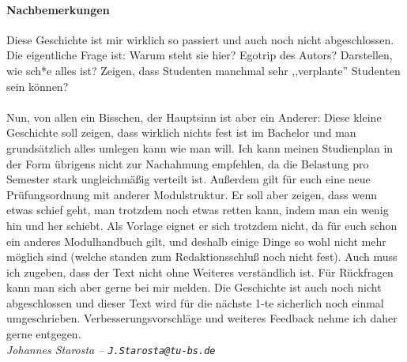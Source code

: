 \paragraph{Nachbemerkungen}
Diese Geschichte ist mir wirklich so passiert und auch noch nicht
abgeschlossen. %
 Die eigentliche Frage ist: Warum steht sie hier? Egotrip des
Autors? Darstellen, wie sch*e alles ist? Zeigen, dass Studenten
manchmal sehr ,,verplante'' Studenten sein können?\\\\
Nun, von allen ein Bisschen, der Hauptsinn ist aber ein Anderer: Diese
kleine Geschichte soll zeigen, dass wirklich nichts fest ist im
Bachelor und man grundsätzlich alles umlegen kann wie man will. Ich
kann meinen Studienplan in der Form übrigens nicht zur Nachahmung
empfehlen, da die Belastung pro Semester stark ungleichmäßig verteilt
ist.  Außerdem gilt für euch eine neue Prüfungsordnung mit anderer
Modulstruktur. Er soll aber zeigen, dass wenn etwas schief geht, man trotzdem
noch etwas retten kann, indem man ein wenig hin und her schiebt. Als
Vorlage eignet er sich trotzdem nicht, da für euch schon ein anderes
Modulhandbuch gilt, und deshalb einige Dinge so wohl nicht mehr
möglich sind (welche standen zum Redaktionsschluß noch nicht
fest). Auch muss ich zugeben, dass der Text nicht ohne Weiteres
verständlich ist. Für
Rückfragen  kann man sich aber gerne bei mir  melden. Die Geschichte ist
auch noch nicht abgeschlossen und dieser Text wird für die nächste
1-te sicherlich noch einmal umgeschrieben. Verbesserungsvorschläge und
weiteres Feedback nehme ich daher  gerne entgegen.\\
\emph{Johannes Starosta -- \nolinkurl{J.Starosta@tu-bs.de}}

